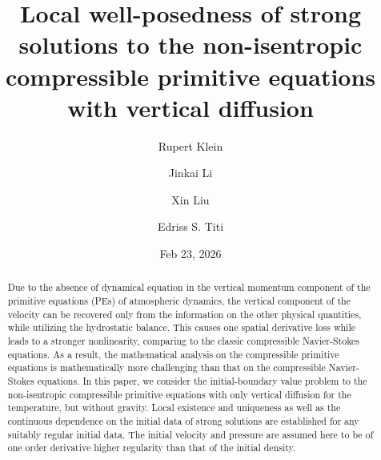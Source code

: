 \documentclass[12pt,reqno]{amsart}
\numberwithin{equation}{section}
\begin{document}
\title[ ]
{Local well-posedness of strong solutions to the non-isentropic compressible primitive equations with vertical diffusion}

\author{Rupert Klein}
\address{Rupert Klein, Institut f\"ur Mathematik, Freie Universit\"at Berlin, Berlin, Germany
}

\author{Jinkai Li}
\address{Jinkai Li, South China Research Center for Applied Mathematics and Interdisciplinary Studies, School of Mathematical Sciences, South China Normal University, Zhong Shan Avenue West 55, Guangzhou 510631, P. R. China}

\author{Xin Liu}
\address{Xin Liu, Department of Mathematics, Texas A\&M University, College Station, TX 77843-3368, USA}

	\author{Edriss S. Titi}
\address{Edriss S. Titi, Department of Mathematics, Texas A\&M University, College Station, TX 77840, USA.
Department of Applied Mathematics and Theoretical Physics, University of Cambridge,
Cambridge CB3 0WA, UK. Department of Computer Science and Applied Mathematics,
Weizmann Institute of Science, Rehovot 76100, Israel.}
	
		
	
\date{
Feb 23, 2026%
}

\begin{abstract}
Due to the absence of dynamical equation in the vertical momentum component of the primitive equations (PEs) of atmospheric dynamics, the
vertical component of the velocity can be recovered only from the information on the other physical quantities, while utilizing the hydrostatic balance.
This causes one spatial derivative loss while leads to a stronger nonlinearity, comparing to the classic compressible Navier-Stokes equations.
As a result, the mathematical analysis on the compressible primitive equations is mathematically more challenging than that on the compressible Navier-Stokes
equations. In this paper, we consider the initial-boundary value problem to the non-isentropic compressible primitive equations with only vertical diffusion for the temperature, but without gravity. Local existence and uniqueness as well as the
continuous dependence on the initial data of strong
solutions are established for any suitably regular initial data. The initial velocity and pressure are assumed here to be of one order derivative higher regularity than that of the initial density.
 \end{abstract}
\end{document}
